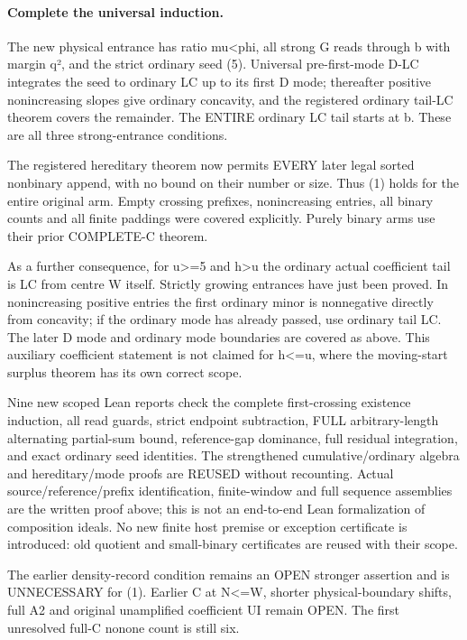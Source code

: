 \paragraph{Complete the universal induction.}
The new physical entrance has ratio mu<phi, all strong G reads
through b with margin q², and the strict ordinary seed (5).
Universal pre-first-mode D-LC integrates the seed to ordinary LC
up to its first D mode; thereafter positive nonincreasing slopes
give ordinary concavity, and the registered ordinary tail-LC theorem
covers the remainder. The ENTIRE ordinary LC tail starts at b.
These are all three strong-entrance conditions.

The registered hereditary theorem now permits EVERY later legal
sorted nonbinary append, with no bound on their number or size.
Thus (1) holds for the entire original arm. Empty crossing prefixes,
nonincreasing entries, all binary counts and all finite paddings were
covered explicitly. Purely binary arms use their prior COMPLETE-C theorem.

As a further consequence, for u>=5 and h>u the ordinary actual
coefficient tail is LC from centre W itself.
Strictly growing entrances have just been proved. In nonincreasing
positive entries the first ordinary minor is nonnegative directly from
concavity; if the ordinary mode has already passed, use ordinary tail LC.
The later D mode and ordinary mode boundaries are covered as above.
This auxiliary coefficient statement is not claimed for h<=u,
where the moving-start surplus theorem has its own correct scope.

Nine new scoped Lean reports check the complete first-crossing
existence induction, all read guards, strict endpoint subtraction,
FULL arbitrary-length alternating partial-sum bound, reference-gap
dominance, full residual integration, and exact ordinary seed identities.
The strengthened cumulative/ordinary algebra and hereditary/mode proofs
are REUSED without recounting. Actual source/reference/prefix identification,
finite-window and full sequence assemblies are the written proof above;
this is not an end-to-end Lean formalization of composition ideals.
No new finite host premise or exception certificate is introduced:
old quotient and small-binary certificates are reused with their scope.

The earlier density-record condition remains an OPEN stronger assertion
and is UNNECESSARY for (1). Earlier C at N<=W, shorter physical-boundary
shifts, full A2 and original unamplified coefficient UI remain OPEN.
The first unresolved full-C nonone count is still six.

